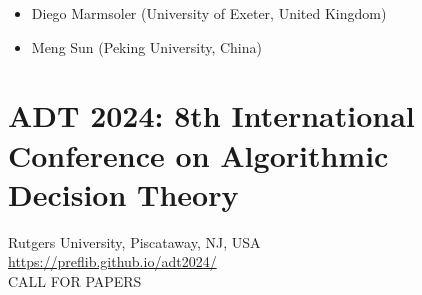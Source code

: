 \documentclass[prodmode,acmtecs]{acmsmall} %
\begin{document}
\begin{itemize}
\begin{itemize}\item  Diego Marmsoler (University of Exeter, United Kingdom)
\item  Meng Sun (Peking University, China)
\end{itemize} 
\end{itemize}\section{ADT 2024: 8th International Conference on Algorithmic Decision Theory }\label{ADT2024}  Rutgers University, Piscataway, NJ, USA\\ 
  \href{https://preflib.github.io/adt2024/}{https://preflib.github.io/adt2024/}\\ 
CALL FOR PAPERS 
\end{document}
